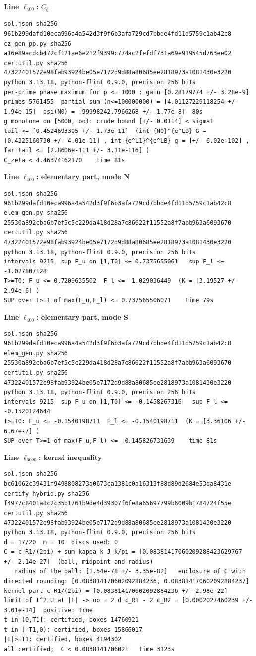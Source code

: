 \documentclass[11pt,reqno]{amsart}
\numberwithin{equation}{section}
\theoremstyle{definition}
\theoremstyle{remark}
\newcommand{\appsub}[1]{\par\medskip\noindent\textbf{#1}\par\nobreak\smallskip}
\begin{document}
\appsub{Line $\ell_{400}$: $C_\zeta$}
\begin{lstlisting}
sol.json sha256 961b299dafd10eca996a4a542d3f9f6b3afa729cd7bbde4fd11d5759c1ab42c8
cz_gen_pp.py sha256 a16e89acdcb472cf121ae6e212f9399c774ac2fefdf731a69e919545d763ee02
certutil.py sha256 47322401572e98fab93924be05e7172d9d88a80685ee2818973a1081430e3220
python 3.13.18, python-flint 0.9.0, precision 256 bits
per-prime phase maximum for p <= 1000 : gain [0.28179774 +/- 3.28e-9]
primes 5761455  partial sum (n<=100000000) = [4.01127229118254 +/- 1.94e-15]  psi(N0) = [99998242.7966268 +/- 1.77e-8]  80s
g monotone on [5000, oo): crude bound [+/- 0.0114] < sigma1
tail <= [0.4524693305 +/- 1.73e-11]  (int_{N0}^{e^LB} G = [0.4325160730 +/- 4.01e-11] , int_{e^L1}^{e^LB} g = [+/- 6.02e-102] , far tail <= [2.8606e-111 +/- 3.11e-116] )
C_zeta < 4.46374162170    time 81s
\end{lstlisting}
\appsub{Line $\ell_{400}$: elementary part, mode N}
\begin{lstlisting}
sol.json sha256 961b299dafd10eca996a4a542d3f9f6b3afa729cd7bbde4fd11d5759c1ab42c8
elem_gen.py sha256 25530a892cba6b7ef5c5c229da418d28a7e86622f11552a8f7abb963a6093670
certutil.py sha256 47322401572e98fab93924be05e7172d9d88a80685ee2818973a1081430e3220
python 3.13.18, python-flint 0.9.0, precision 256 bits
intervals 9215  sup F_u on [1,T0] <= 0.7375655061   sup F_l <= -1.027807128
T>=T0: F_u <= 0.7209635502  F_l <= -1.029036449  (K = [3.19527 +/- 2.94e-6] )
SUP over T>=1 of max(F_u,F_l) <= 0.737565506071    time 79s
\end{lstlisting}
\appsub{Line $\ell_{400}$: elementary part, mode S}
\begin{lstlisting}
sol.json sha256 961b299dafd10eca996a4a542d3f9f6b3afa729cd7bbde4fd11d5759c1ab42c8
elem_gen.py sha256 25530a892cba6b7ef5c5c229da418d28a7e86622f11552a8f7abb963a6093670
certutil.py sha256 47322401572e98fab93924be05e7172d9d88a80685ee2818973a1081430e3220
python 3.13.18, python-flint 0.9.0, precision 256 bits
intervals 9215  sup F_u on [1,T0] <= -0.1458267316   sup F_l <= -0.1520124644
T>=T0: F_u <= -0.1540198711  F_l <= -0.1540198711  (K = [3.36106 +/- 6.67e-7] )
SUP over T>=1 of max(F_u,F_l) <= -0.145826731639    time 81s
\end{lstlisting}
\appsub{Line $\ell_{6000}$: kernel inequality}
\begin{lstlisting}
sol.json sha256 bc61062c39431f9498808273a0673ca1381c0a16313f88d89d2684e53da8431e
certify_hybrid.py sha256 f4977c8401a8c2c35b1761b9de4d39307f6fe8a65697799b6009b1784724f55e
certutil.py sha256 47322401572e98fab93924be05e7172d9d88a80685ee2818973a1081430e3220
python 3.13.18, python-flint 0.9.0, precision 256 bits
d = 17/20  m = 10  discs used: 0 
C = c_R1/(2pi) + sum kappa_k J_k/pi = [0.08381417060209288423629767 +/- 2.14e-27]  (ball, midpoint and radius)
   radius of the ball: [1.54e-78 +/- 3.35e-82]   enclosure of C with directed rounding: [0.083814170602092884236, 0.083814170602092884237]
kernel part c_R1/(2pi) = [0.083814170602092884236 +/- 2.98e-22]
limit of t^2 U at |t| -> oo = 2 d c_R1 - 2 c_R2 = [0.0002027460239 +/- 3.01e-14]  positive: True
t in (0,T1]: certified, boxes 14760921
t in [-T1,0): certified, boxes 15866017
|t|>=T1: certified, boxes 4194302
all certified;  C < 0.0838141706021   time 3123s
\end{lstlisting}
\end{document}
